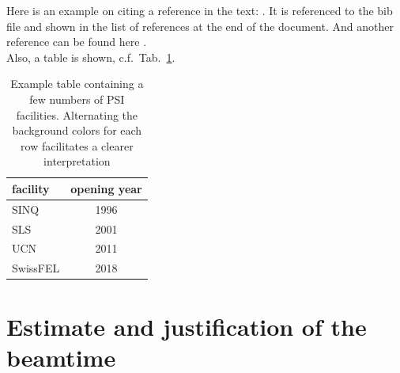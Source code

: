 \documentclass[12pt,a4paper]{style}
\begin{document}
Here is an example on citing a reference in the text: \cite{sakai2000}. It is referenced to the bib file and shown in the list of references at the end of the document. And another reference can be found here \cite{diels2006}. \lipsum[4] \\

Also, a table is shown, c.f.~Tab.~\ref{table}. \lipsum[5] \\

\begin{table} [htbp]
\centering
    {
    \begin{tabularx}{0.4\textwidth}{X c}
        \toprule
        \textbf{facility} & \textbf{opening year} \\
        \midrule
        SINQ & 1996 \\
        SLS & 2001 \\
        UCN & 2011 \\
        SwissFEL & 2018 \\
        \bottomrule
    \end{tabularx}
    \caption{Example table containing a few numbers of PSI facilities. Alternating the background colors for each row facilitates a clearer interpretation \label{table}}
    }
\end{table}
\lipsum[8-9]

\section{\bf Estimate and justification of the beamtime}
\label{sec:estimation}
\lipsum[5-6]

\footnotesize %

 
\normalsize
\end{document}
